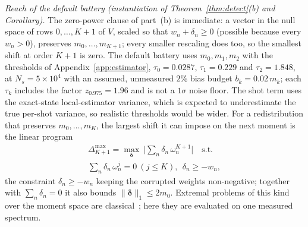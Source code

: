 \documentclass[submission, PhysCore]{SciPost}
\begin{document}
\begin{appendix}
\emph{Reach of the default battery (instantiation of Theorem~\ref{thm:detect}(b) and Corollary).} The zero-power clause of part~(b) is immediate: a vector in the null space of rows $0,\dots,K{+}1$ of $V$, scaled so that $w_n+\delta_n\ge0$ (possible because every $w_n>0$), preserves $m_0,\dots,m_{K+1}$; every smaller rescaling does too, so the smallest shift at order $K{+}1$ is zero. The default battery uses $m_0,m_1,m_2$ with the thresholds of Appendix~\ref{app:estimator}, $\tau_0=0.0287$, $\tau_1=0.229$ and $\tau_2=1.848$, at $N_s=5\times10^4$ with an assumed, unmeasured $2\%$ bias budget $b_k=0.02\,m_k$; each $\tau_k$ includes the factor $z_{0.975}=1.96$ and is not a $1\sigma$ noise floor. The shot term uses the exact-state local-estimator variance, which is expected to underestimate the true per-shot variance, so realistic thresholds would be wider. For a redistribution that preserves $m_0,\dots,m_K$, the largest shift it can impose on the next moment is the linear program
\begin{equation}
\begin{split}
\Delta_{K+1}^{\max}=\max_{\bm{\delta}}\ \Big|\textstyle\sum_n \delta_n\,\omega_n^{K+1}\Big|\quad\text{s.t.}\\[2pt]
\textstyle\sum_n\delta_n\,\omega_n^{j}=0\ (j\le K),\ \ \delta_n\ge -w_n,
\end{split}
\label{eq:wclp}
\end{equation}
the constraint $\delta_n\ge-w_n$ keeping the corrupted weights non-negative; together with $\sum_n\delta_n=0$ it also bounds $\|\bm{\delta}\|_1\le2m_0$. Extremal problems of this kind over the moment space are classical~\cite{KarlinStudden1966,KreinNudelman1977}; here they are evaluated on one measured spectrum.


\end{appendix}
\end{document}

